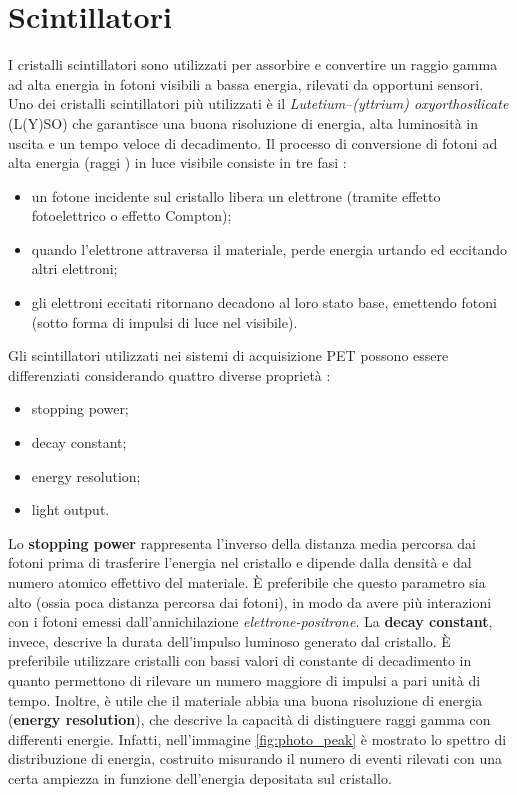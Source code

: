 \section{Scintillatori}
I cristalli scintillatori sono utilizzati per assorbire e convertire un raggio gamma ad alta energia in fotoni visibili a bassa energia, rilevati da opportuni sensori. Uno dei cristalli scintillatori più utilizzati è il \textit{Lutetium–(yttrium) oxyorthosilicate} (L(Y)SO) che garantisce una buona risoluzione di energia, alta luminosità in uscita e un tempo veloce di decadimento. Il processo di conversione di fotoni ad alta energia (raggi \textgamma) in luce visibile consiste in tre fasi \cite{RamseyDerek}:
\begin{itemize}
	\item un fotone incidente sul cristallo libera un elettrone (tramite effetto fotoelettrico o effetto Compton);
	\item quando l'elettrone attraversa il materiale, perde energia urtando ed eccitando altri elettroni;
	\item gli elettroni eccitati ritornano decadono al loro stato base, emettendo fotoni (sotto forma di impulsi di luce nel visibile).
\end{itemize}
Gli scintillatori utilizzati nei sistemi di acquisizione PET possono essere differenziati considerando quattro diverse proprietà \cite{Schmitz2013ThePO}:
\begin{itemize}
	\item stopping power;
	\item decay constant;
	\item energy resolution;
	\item light output.
\end{itemize}
Lo \textbf{stopping power} rappresenta l'inverso della distanza media percorsa dai fotoni prima di trasferire l'energia nel cristallo e dipende dalla densità e dal numero atomico effettivo del materiale. \`E preferibile che questo parametro sia alto (ossia poca distanza percorsa dai fotoni), in modo da avere più interazioni con i fotoni emessi dall'annichilazione \textit{elettrone-positrone}. La \textbf{decay constant}, invece, descrive la durata dell'impulso luminoso generato dal cristallo. \`E preferibile utilizzare cristalli con bassi valori di constante di decadimento in quanto permettono di rilevare un numero maggiore di impulsi a pari unità di tempo. Inoltre, è utile che il materiale abbia una buona risoluzione di energia (\textbf{energy resolution}), che descrive la capacità di distinguere raggi gamma con differenti energie. Infatti, nell'immagine \ref{fig:photo_peak} è mostrato lo spettro di distribuzione di energia, costruito misurando il numero di eventi rilevati con una certa ampiezza in funzione dell'energia depositata sul cristallo.
